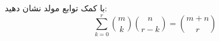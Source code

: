 \EXERCISE
با کمک توابع مولد نشان دهید:
$$\sum_{k=0}^{r} \binom{m}{k} \binom{n}{r-k} = \binom{m+n}{r}$$